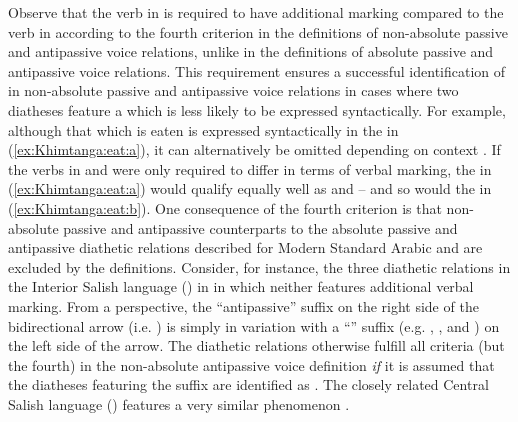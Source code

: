 \largerpage[-1]
Observe that the verb in  is required to have additional marking compared to the verb in  according to the fourth criterion in the definitions of non-absolute passive and antipassive voice relations, unlike in the definitions of absolute passive and antipassive voice relations. This requirement ensures a successful identification of  in non-absolute passive and antipassive voice relations in cases where two diatheses feature a  which is less likely to be expressed syntactically. For example, although that which is eaten is expressed syntactically in the   in (\ref{ex:Khimtanga:eat:a}), it can alternatively be omitted depending on context \citep[345]{belay:2015}. If the verbs in  and  were only required to differ in terms of verbal marking, the  in (\ref{ex:Khimtanga:eat:a}) would qualify equally well as  and  -- and so would the  in (\ref{ex:Khimtanga:eat:b}). One consequence of the fourth criterion is that non-absolute passive and antipassive counterparts to the absolute passive and antipassive diathetic relations described for Modern Standard Arabic and  are excluded by the definitions. Consider, for instance, the three diathetic relations in the Interior Salish language  () in  in which neither  features additional verbal marking. From a  perspective, the “antipassive” suffix on the right side of the bidirectional arrow (i.e. ) is simply in variation with a “” suffix (e.g. , , and ) on the left side of the arrow. The diathetic relations otherwise fulfill all criteria (but the fourth) in the non-absolute antipassive voice definition \textit{if} it is assumed that the diatheses featuring the suffix  are identified as . The closely related Central Salish language  () features a very similar phenomenon \citep{suttles:2004}.

